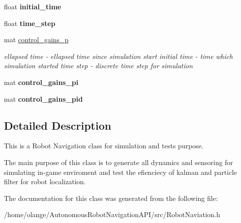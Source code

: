 \begin{DoxyCompactItemize}
float {\bfseries initial\+\_\+time}
\item 
\mbox{\label{class_robot_navigation_a1f1de08123eaff99571bb21fa411d4dd}} 
float {\bfseries time\+\_\+step}
\item 
\mbox{\label{class_robot_navigation_ad7ff88f46b33d23be62fc365b650361e}} 
mat \hyperlink{class_robot_navigation_ad7ff88f46b33d23be62fc365b650361e}{control\+\_\+gains\+\_\+p}
\begin{DoxyCompactList}\small\item\em ellapsed time -\/ ellapsed time since simulation start initial time -\/ time which simulation started time step -\/ discrete time step for simulation \end{DoxyCompactList}\item 
\mbox{\label{class_robot_navigation_a90738c7f4f1a884edce67e44769b284b}} 
mat {\bfseries control\+\_\+gains\+\_\+pi}
\item 
\mbox{\label{class_robot_navigation_a0f450c83221af7ef3e276b65ebfdc50d}} 
mat {\bfseries control\+\_\+gains\+\_\+pid}
\end{DoxyCompactItemize}


\subsection{Detailed Description}
This is a Robot Navigation class for simulation and tests purpose. 

The main purpose of this class is to generate all dynamics and sensoring for simulating in-\/game enviroment and test the efienciecy of kalman and particle filter for robot localization. 

The documentation for this class was generated from the following file\+:\begin{DoxyCompactItemize}
\item 
/home/olange/\+Autonomous\+Robot\+Navigation\+A\+P\+I/src/Robot\+Naviation.\+h\end{DoxyCompactItemize}
